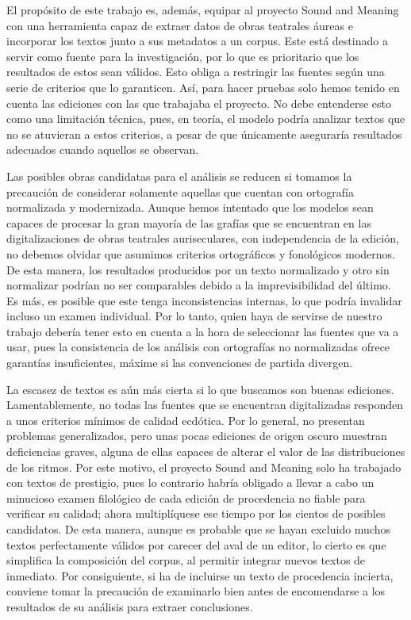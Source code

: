 El propósito de este trabajo es, además, equipar al proyecto Sound and Meaning con una herramienta capaz de extraer datos de obras teatrales áureas e incorporar los textos junto a sus metadatos a un corpus. Este está destinado a servir como fuente para la investigación, por lo que es prioritario que los resultados de estos sean válidos. Esto obliga a restringir las fuentes según una serie de criterios que lo garanticen. Así, para hacer pruebas solo hemos tenido en cuenta las ediciones con las que trabajaba el proyecto. No debe entenderse esto como una limitación técnica, pues, en teoría, el modelo podría analizar textos que no se atuvieran a estos criterios, a pesar de que únicamente aseguraría resultados adecuados cuando aquellos se observan.

Las posibles obras candidatas para el análisis se reducen si tomamos la precaución de considerar solamente aquellas que cuentan con ortografía normalizada y modernizada. Aunque hemos intentado que los modelos sean capaces de procesar la gran mayoría de las grafías que se encuentran en las digitalizaciones de obras teatrales auriseculares, con independencia de la edición, no debemos olvidar que asumimos criterios ortográficos y fonológicos modernos. De esta manera, los resultados producidos por un texto normalizado y otro sin normalizar podrían no ser comparables debido a la imprevisibilidad del último. Es más, es posible que este tenga inconsistencias internas, lo que podría invalidar incluso un examen individual. Por lo tanto, quien haya de servirse de nuestro trabajo debería tener esto en cuenta a la hora de seleccionar las fuentes que va a usar, pues la consistencia de los análisis con ortografías no normalizadas ofrece garantías insuficientes, máxime si las convenciones de partida divergen.

La escasez de textos es aún más cierta si lo que buscamos son buenas ediciones. Lamentablemente, no todas las fuentes que se encuentran digitalizadas responden a unos criterios mínimos de calidad ecdótica. Por lo general, no presentan problemas generalizados, pero unas pocas ediciones de origen oscuro muestran deficiencias graves, alguna de ellas capaces de alterar el valor de las distribuciones de los ritmos. Por este motivo, el proyecto Sound and Meaning solo ha trabajado con textos de prestigio, pues lo contrario habría obligado a llevar a cabo un minucioso examen filológico de cada edición de procedencia no fiable para verificar su calidad; ahora multiplíquese ese tiempo por los cientos de posibles candidatos. De esta manera, aunque es probable que se hayan excluido muchos textos perfectamente válidos por carecer del aval de un editor, lo cierto es que simplifica la composición del corpus, al permitir integrar nuevos textos de inmediato. Por consiguiente, si ha de incluirse un texto de procedencia incierta, conviene tomar la precaución de examinarlo bien antes de encomendarse a los resultados de su análisis para extraer conclusiones.

